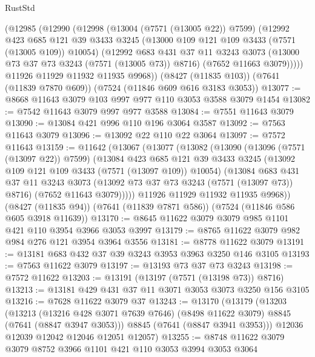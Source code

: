 \begin{lexlean}{RustStd}
\begin{coremodule}
{\begin{coremodule}
{{{{{{{{{{{{{{{{{{{{{{{{{{{{{{{{      (@12985
        (@12990
          (@12998
            (@13004 (@7571 (@13005 @22)) @7599)
            (@12992
              @423
              @685
              @121
              @39
              @3433
              @3245
              (@13000 @109 @121 @109 @3433 (@7571 (@13005 @109)) @10054)
              (@12992
                @683
                @431
                @37
                @11
                @3243
                @3073
                (@13000 @73 @37 @73 @3243 (@7571 (@13005 @73)) @8716)
                (@7652 @11663 @3079)))))
        @11926
        @11929
        @11932
        @11935
        @9968))
    (@8427 (@11835 @103))
    (@7641 (@11839 @7870 @609))
    (@7524 (@11846 @609 @616 @3183 @3053))
@13077 := @8668 @11643 @3079 @103 @997 @977 @110 @3053 @3588 @3079 @1454
@13082 := @7542 @11643 @3079 @997 @977 @3588
@13084 := @7551 @11643 @3079
@13090 := @13084 @421 @996 @110 @196 @3064 @3587
@13092 := @7563 @11643 @3079
@13096 := @13092 @22 @110 @22 @3064
@13097 := @7572 @11643
@13159 := @11642
    (@13067
      (@13077
        (@13082
          (@13090
            (@13096 (@7571 (@13097 @22)) @7599)
            (@13084
              @423
              @685
              @121
              @39
              @3433
              @3245
              (@13092 @109 @121 @109 @3433 (@7571 (@13097 @109)) @10054)
              (@13084
                @683
                @431
                @37
                @11
                @3243
                @3073
                (@13092 @73 @37 @73 @3243 (@7571 (@13097 @73)) @8716)
                (@7652 @11643 @3079)))))
        @11926
        @11929
        @11932
        @11935
        @9968))
    (@8427 (@11835 @94))
    (@7641 (@11839 @7871 @586))
    (@7524 (@11846 @586 @605 @3918 @11639))
@13170 := @8645 @11622 @3079 @3079 @985 @1101 @421 @110 @3954 @3966 @3053 @3997
@13179 := @8765 @11622 @3079 @982 @984 @276 @121 @3954 @3964 @3556
@13181 := @8778 @11622 @3079
@13191 := @13181 @683 @432 @37 @39 @3243 @3953 @3963 @3250 @146 @3105
@13193 := @7563 @11622 @3079
@13197 := @13193 @73 @37 @73 @3243
@13198 := @7572 @11622
@13203 := @13191 (@13197 (@7571 (@13198 @73)) @8716)
@13213 := @13181 @429 @431 @37 @11 @3071 @3053 @3073 @3250 @156 @3105
@13216 := @7628 @11622 @3079 @37
@13243 := @13170
    (@13179
      (@13203
        (@13213
          (@13216 @428 @3071 @7639 @7646)
          (@8498 @11622 @3079)
          @8845
          (@7641 (@8847 @3947 @3053)))
        @8845
        (@7641 (@8847 @3941 @3953)))
      @12036
      @12039
      @12042
      @12046
      @12051
      @12057)
@13255 := @8748 @11622 @3079 @3079 @8752 @3966 @1101 @421 @110 @3053 @3994 @3053 @3064
}}}}}}}}}}}}}}}}}}}}}}}}}}}}}}}}
\end{coremodule}}
\end{coremodule}
\end{lexlean}
